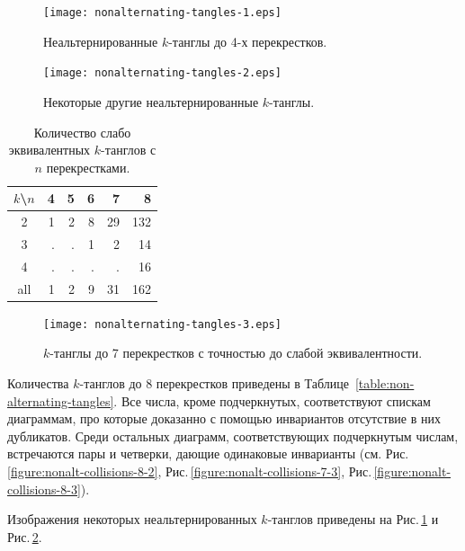 \documentclass[12pt]{article}
\theoremstyle{plain}
\theoremstyle{definition}
\def\figureref#1{Рис.\,\protect\ref{#1}}
\begin{document}
		\begin{figure}[ht]
			\centering
			\texttt{[image: nonalternating-tangles-1.eps]}
			\caption{\footnotesize Неальтернированные $k$-танглы до 4-х перекрестков.\label{figure:nonalternating-tangles-4}}
		\end{figure}

		\begin{figure}[ht]
			\centering
			\texttt{[image: nonalternating-tangles-2.eps]}
			\caption{\footnotesize Некоторые другие неальтернированные $k$-танглы.\label{figure:nonalternating-tangles-rest}}
		\end{figure}

		\begin{table}[ht]
			\caption{Количество слабо эквивалентных $k$-танглов с $n$ перекрестками.\label{table:weak-tangles}}
			\centering
			\begin{tabular}{|c||r|r|r|r|r|}
			\hline
			$k$\textbackslash $n$
			    & 4 & 5 & 6 &  7 &   8 \\
			\hline\hline
			2   & 1 & 2 & 8 & 29 & 132 \\
			3   & . & . & 1 &  2 &  14 \\
			4   & . & . & . &  . &  16 \\
			\hline
			all & 1 & 2 & 9 & 31 & 162 \\
			\hline
			\end{tabular}
		\end{table}

		\begin{figure}[ht]
			\centering
			\texttt{[image: nonalternating-tangles-3.eps]}
			\caption{\footnotesize $k$-танглы до 7 перекрестков с точностью до слабой эквивалентности.\label{figure:weak-tangles-7}}
		\end{figure}

		Количества $k$-танглов до 8 перекрестков приведены в Таблице~\ref{table:non-alternating-tangles}. Все числа, кроме подчеркнутых,
		соответствуют спискам диаграммам, про которые доказанно с помощью инвариантов отсутствие в них дубликатов. Среди остальных
		диаграмм, соответствующих подчеркнутым числам, встречаются пары и четверки, дающие одинаковые инварианты
		(см. \figureref{figure:nonalt-collisions-8-2}, \figureref{figure:nonalt-collisions-7-3}, \figureref{figure:nonalt-collisions-8-3}).

		Изображения некоторых неальтернированных $k$-танглов приведены на \figureref{figure:nonalternating-tangles-4} и
		\figureref{figure:nonalternating-tangles-rest}.
\end{document}
